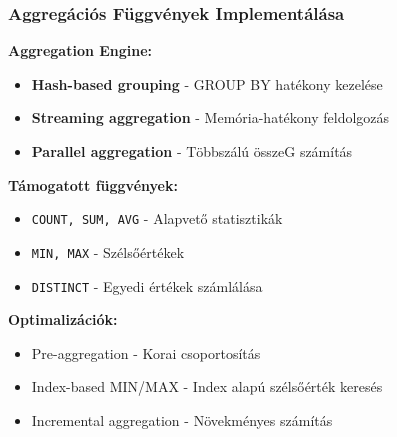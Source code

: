 \documentclass{beamer}
\begin{document}
\begin{frame}
\frametitle{Aggregációs Függvények Implementálása}

\textbf{Aggregation Engine:}
\begin{itemize}
    \item \textbf{Hash-based grouping} - GROUP BY hatékony kezelése
    \item \textbf{Streaming aggregation} - Memória-hatékony feldolgozás
    \item \textbf{Parallel aggregation} - Többszálú összeG számítás
\end{itemize}

\vspace{0.3cm}
\textbf{Támogatott függvények:}
\begin{itemize}
    \item \texttt{COUNT, SUM, AVG} - Alapvető statisztikák
    \item \texttt{MIN, MAX} - Szélsőértékek
    \item \texttt{DISTINCT} - Egyedi értékek számlálása
\end{itemize}

\vspace{0.3cm}
\textbf{Optimalizációk:}
\begin{itemize}
    \item Pre-aggregation - Korai csoportosítás
    \item Index-based MIN/MAX - Index alapú szélsőérték keresés
    \item Incremental aggregation - Növekményes számítás
\end{itemize}

\end{frame}
\end{document}

